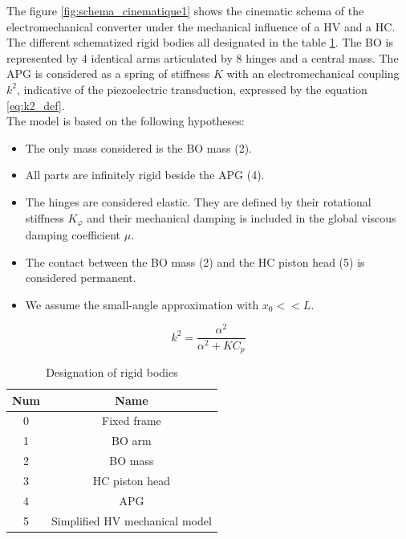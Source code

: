 \documentclass[3p,twocolumn,preprint]{elsarticle}
\begin{document}
The figure \ref{fig:schema_cinematique1} shows the cinematic schema of the electromechanical converter under the mechanical influence of a HV and a HC. The different schematized rigid bodies all designated in the table \ref{tab:Designation of rigid bodies}. The BO is represented by 4 identical arms articulated by 8 hinges and a central mass. The APG is considered as a spring of stiffness $K$ with an electromechanical coupling $k^2$, indicative of the piezoelectric transduction, expressed by the equation \ref{eq:k2_def}.\\
The model is based on the following hypotheses:
\begin{itemize}
	\item The only mass considered is the BO mass (2).
	\item All parts are infinitely rigid beside the APG (4).
	\item The hinges are considered elastic. They are defined by their rotational stiffness $K_{\varphi}$ and their mechanical damping is included in the global viscous damping coefficient $\mu$.
	\item The contact between the BO mass (2) and the HC piston head (5) is considered permanent.
	\item We assume the small-angle approximation with \mbox{$x_0<<L$}. 
\end{itemize}
\begin{equation}
	k^2 = \dfrac{\alpha^2}{\alpha^2 +  K C_p}
	\label{eq:k2_def}
\end{equation}
\begin{table}[!htbp]
\centering
	\begin{tabular}{ c | c }
		\toprule
		\multicolumn{1}{c}{\textbf{Num}}  &
		\multicolumn{1}{c}{\textbf{Name}}  \\
		\midrule
		0	& Fixed frame      	  	\\  
		1	& BO arm      	  	\\  
		2	& BO mass     	\\
		3	& HC piston head	\\
		4	& APG     	\\
		5	& Simplified HV mechanical model     	\\
		\bottomrule
	\end{tabular}
	\caption{Designation of rigid bodies}
\label{tab:Designation of rigid bodies}
\end{table} 
\end{document}
